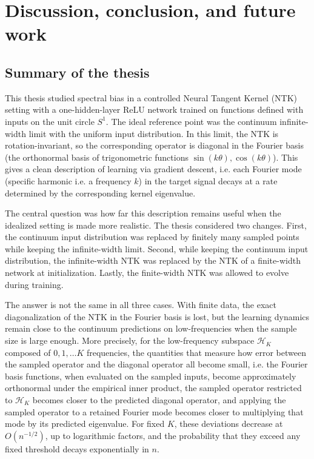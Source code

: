 \chapter{\label{cha:discussion-conclusion}Discussion, conclusion, and future work}

\section{Summary of the thesis}
\label{sec:discussion-summary}

This thesis studied spectral bias in a controlled Neural Tangent Kernel (NTK)
setting with a one-hidden-layer ReLU network trained on functions defined with
inputs on the unit circle \(S^1\). The ideal reference point was the continuum
infinite-width limit with the uniform input distribution. In this limit, the
NTK is rotation-invariant, so the corresponding operator is diagonal in the
Fourier basis (the orthonormal basis of trigonometric functions \(\sin(k\theta),
\cos(k\theta)\)). This gives a clean description of learning via gradient
descent, i.e. each Fourier mode (specific harmonic i.e. a frequency \(k\)) in the target signal
decays at a rate determined by the corresponding kernel eigenvalue.

The central question was how far this description remains useful when the
idealized setting is made more realistic. The thesis considered two changes.
First, the continuum input distribution was replaced by finitely many sampled
points while keeping the infinite-width limit. Second, while keeping the
continuum input distribution, the infinite-width NTK was replaced by the NTK of
a finite-width network at initialization. Lastly, the finite-width NTK was
allowed to evolve during training.

The answer is not the same in all three cases. With finite data, the exact
diagonalization of the NTK in the Fourier basis is lost, but the learning
dynamics remain close to the continuum predictions on low-frequencies when the
sample size is large enough. More precisely, for the low-frequency subspace
\(\mathcal H_K\) composed of \(0,1, \ldots K\) frequencies, the quantities that
measure how error between the sampled operator and the diagonal operator all
become small, i.e. the Fourier basis functions, when evaluated on the sampled inputs, become
approximately orthonormal under the empirical inner product, the
sampled operator restricted to \(\mathcal H_K\) becomes closer to the predicted
diagonal operator, and applying the sampled operator to a retained Fourier mode
becomes closer to multiplying that mode by its predicted eigenvalue. For fixed
\(K\), these deviations decrease at \(O(n^{-1/2})\), up to logarithmic
factors, and the probability that they exceed any fixed threshold decays
exponentially in \(n\).

